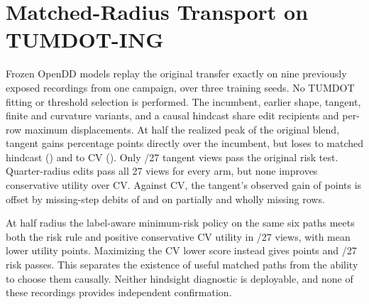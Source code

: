 \section{Matched-Radius Transport on TUMDOT-ING}
Frozen OpenDD models replay the original transfer exactly on nine
previously exposed recordings from one campaign, over three training
seeds. No TUMDOT fitting or threshold selection is performed. The
incumbent, earlier shape, tangent, finite and curvature variants,
and a causal hindcast share edit recipients and per-row maximum
displacements. At half the realized peak of the original blend,
tangent gains \MatchedTransferIncumbent{} percentage points directly
over the incumbent, but loses to matched hindcast
(\MatchedTransferHindcast{}) and to CV (\MatchedTransferCV{}).
Only \MatchedTransferRisk/27 tangent views pass the original risk
test. Quarter-radius edits pass all 27 views for every arm, but
none improves conservative utility over CV. Against CV, the
tangent's observed gain of \MatchedTransferObserved{} points
is offset by missing-step debits of \MatchedTransferPartial{}
and \MatchedTransferMissing{} on partially and wholly missing rows.

At half radius the label-aware minimum-risk policy on the same
six paths meets both the risk rule and positive conservative CV
utility in \MatchedTransferWitness/27 views, with mean lower utility
\MatchedTransferWitnessUtility{} points. Maximizing the CV lower
score instead gives \MatchedTransferOptUtility{} points and
\MatchedTransferOptRisk/27 risk passes. This separates the existence
of useful matched paths from the ability to choose them causally.
Neither hindsight diagnostic is deployable, and none of these
recordings provides independent confirmation.
